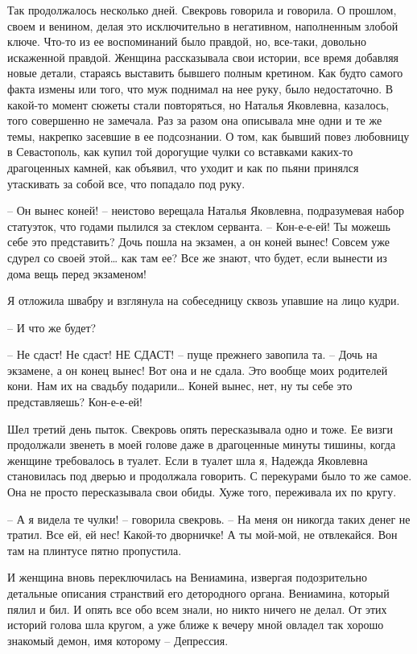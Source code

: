 \documentclass[
]{book}
\begin{document}
Так продолжалось несколько дней. Свекровь говорила и говорила. О прошлом, своем и венином, делая это исключительно в негативном, наполненным злобой ключе. Что-то из ее воспоминаний было правдой, но, все-таки, довольно искаженной правдой. Женщина рассказывала свои истории, все время добавляя новые детали, стараясь выставить бывшего полным кретином. Как будто самого факта измены или того, что муж поднимал на нее руку, было недостаточно. В какой-то момент сюжеты стали повторяться, но Наталья Яковлевна, казалось, того совершенно не замечала. Раз за разом она описывала мне одни и те же темы, накрепко засевшие в ее подсознании. О том, как бывший повез любовницу в Севастополь, как купил той дорогущие чулки со вставками каких-то драгоценных камней, как объявил, что уходит и как по пьяни принялся утаскивать за собой все, что попадало под руку.

-- Он вынес коней! -- неистово верещала Наталья Яковлевна, подразумевая набор статуэток, что годами пылился за стеклом серванта. -- Кон-е-е-ей! Ты можешь себе это представить? Дочь пошла на экзамен, а он коней вынес! Совсем уже сдурел со своей этой\ldots{} как там ее? Все же знают, что будет, если вынести из дома вещь перед экзаменом!

Я отложила швабру и взглянула на собеседницу сквозь упавшие на лицо кудри.

-- И что же будет?

-- Не сдаст! Не сдаст! НЕ СДАСТ! -- пуще прежнего завопила та. -- Дочь на экзамене, а он конец вынес! Вот она и не сдала. Это вообще моих родителей кони. Нам их на свадьбу подарили\ldots{} Коней вынес, нет, ну ты себе это представляешь? Кон-е-е-ей!

Шел третий день пыток. Свекровь опять пересказывала одно и тоже. Ее визги продолжали звенеть в моей голове даже в драгоценные минуты тишины, когда женщине требовалось в туалет. Если в туалет шла я, Надежда Яковлевна становилась под дверью и продолжала говорить. С перекурами было то же самое. Она не просто пересказывала свои обиды. Хуже того, переживала их по кругу.

-- А я видела те чулки! -- говорила свекровь. -- На меня он никогда таких денег не тратил. Все ей, ей нес! Какой-то дворничке! А ты мой-мой, не отвлекайся. Вон там на плинтусе пятно пропустила.

И женщина вновь переключилась на Вениамина, извергая подозрительно детальные описания странствий его детородного органа. Вениамина, который пялил и бил. И опять все обо всем знали, но никто ничего не делал. От этих историй голова шла кругом, а уже ближе к вечеру мной овладел так хорошо знакомый демон, имя которому -- Депрессия.
\end{document}
